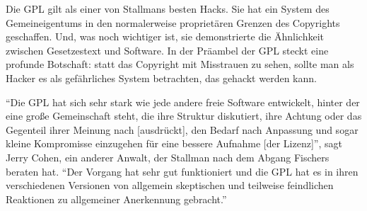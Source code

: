 Die GPL gilt als einer von Stallmans besten Hacks. Sie hat ein System des Gemeineigentums in den normalerweise proprietären Grenzen des Copyrights geschaffen. Und, was noch wichtiger ist, sie demonstrierte die Ähnlichkeit zwischen Gesetzestext und Software. In der Präambel der GPL steckt eine profunde Botschaft: statt das Copyright mit Misstrauen zu sehen, sollte man als Hacker es als gefährliches System betrachten, das gehackt werden kann.

"`Die GPL hat sich sehr stark wie jede andere freie Software entwickelt, hinter der eine große Gemeinschaft steht, die ihre Struktur diskutiert, ihre Achtung oder das Gegenteil ihrer Meinung nach [ausdrückt], den Bedarf nach Anpassung und sogar kleine Kompromisse einzugehen für eine bessere Aufnahme [der Lizenz]"', sagt Jerry Cohen, ein anderer Anwalt, der Stallman nach dem Abgang Fischers beraten hat. "`Der Vorgang hat sehr gut funktioniert und die GPL hat es in ihren verschiedenen Versionen von allgemein skeptischen und teilweise feindlichen Reaktionen zu allgemeiner Anerkennung gebracht."'

